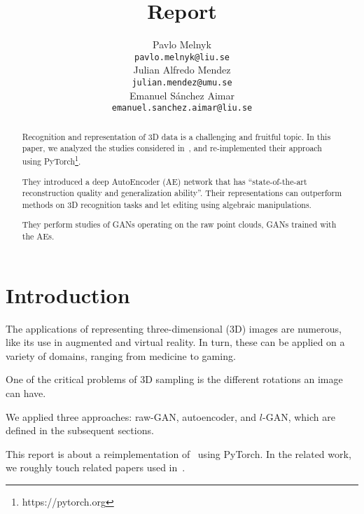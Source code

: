 \documentclass[12pt]{article}
\title{Report}
\author{
    Pavlo Melnyk \\
    \texttt{pavlo.melnyk@liu.se} \\
    \And
    Julian Alfredo Mendez \\
    \texttt{julian.mendez@umu.se} \\
    \And
    Emanuel S\'{a}nchez Aimar \\
    \texttt{emanuel.sanchez.aimar@liu.se} \\
}
\newcommand{\contentdescription}[1]{}
\begin{document}
    \maketitle

    \begin{abstract}
        \contentdescription{
            Abstract (5-10\%) :
            Give an overview of what you have done in the project with the key results and findings of your work.
            Should be no more than 300 words.
        }

        Recognition and representation of 3D data is a challenging and fruitful topic.
        In this paper, we analyzed the studies considered in~\cite{pmlr-v80-achlioptas18a}, and re-implemented their approach using PyTorch\footnote{https://pytorch.org}.

        They introduced a deep AutoEncoder (AE) network that has ``state-of-the-art reconstruction quality and generalization ability''.
        Their representations can outperform methods on 3D recognition tasks and let editing using algebraic manipulations.

        They perform studies of GANs operating on the raw point clouds, GANs trained with the AEs.
    \end{abstract}


    \section{Introduction}

    \contentdescription{
        Introduction (5-15\%):
        Describe the problem, the approach of the paper, the experiments, and the results.
        At the high-level talk about what you worked on in your project and why it is important.
        Then give an overview of your results.
    }

    The applications of representing three-dimensional (3D) images are numerous, like its use in augmented and virtual reality.
    In turn, these can be applied on a variety of domains, ranging from medicine to gaming.

    One of the critical problems of 3D sampling is the different rotations an image can have.

    We applied three approaches: raw-GAN, autoencoder, and $l$-GAN, which are defined in the subsequent sections.

    This report is about a reimplementation of~\cite{pmlr-v80-achlioptas18a} using PyTorch.
    In the related work, we roughly touch related papers used in~\cite{pmlr-v80-achlioptas18a}.
\end{document}
